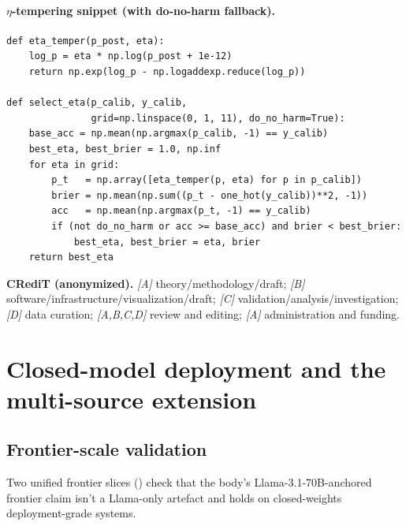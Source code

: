 \paragraph{$\eta$-tempering snippet (with do-no-harm fallback).}
\begin{verbatim}
def eta_temper(p_post, eta):
    log_p = eta * np.log(p_post + 1e-12)
    return np.exp(log_p - np.logaddexp.reduce(log_p))

def select_eta(p_calib, y_calib,
               grid=np.linspace(0, 1, 11), do_no_harm=True):
    base_acc = np.mean(np.argmax(p_calib, -1) == y_calib)
    best_eta, best_brier = 1.0, np.inf
    for eta in grid:
        p_t   = np.array([eta_temper(p, eta) for p in p_calib])
        brier = np.mean(np.sum((p_t - one_hot(y_calib))**2, -1))
        acc   = np.mean(np.argmax(p_t, -1) == y_calib)
        if (not do_no_harm or acc >= base_acc) and brier < best_brier:
            best_eta, best_brier = eta, brier
    return best_eta
\end{verbatim}

\textbf{CRediT (anonymized).}  \textit{[A]} theory/methodology/draft;
\textit{[B]} software/infrastructure/visualization/draft;
\textit{[C]} validation/analysis/investigation; \textit{[D]} data
curation; \textit{[A,B,C,D]} review and editing; \textit{[A]}
administration and funding.


\section{Closed-model deployment and the multi-source extension}
\label{app:letter-K}

\subsection{Frontier-scale validation}
\label{app:frontier-validation}

Two unified frontier slices () check that
the body's Llama-3.1-70B-anchored frontier claim isn't a Llama-only
artefact and holds on closed-weights deployment-grade systems.


